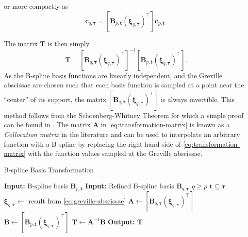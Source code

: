 or more compactly as
\begin{equation}
    [\mathbf B_{q,\boldsymbol \tau}(\boldsymbol \xi_{q,\boldsymbol \tau})^\top] \mathbf c_{q, \boldsymbol \tau} = [\mathbf B_{p,\mathbf t}(\boldsymbol \xi_{q,\boldsymbol \tau})^\top] \mathbf c_{p, \mathbf t}.
\end{equation}

The matrix $\mathbf T$ is then simply
\begin{equation}\label{eq:transformation-matrix-solution}
    \mathbf T = [\mathbf B_{q,\boldsymbol \tau}(\boldsymbol \xi_{q,\boldsymbol \tau})^\top]^{-1} [\mathbf B_{p,\mathbf t}(\boldsymbol \xi_{q,\boldsymbol \tau})^{\top}].
\end{equation}
As the B-spline basis functions are linearly independent, and the Greville abscissae are chosen such that each basis function is sampled at a point near the ``center'' of its support, the matrix $[\mathbf B_{q,\boldsymbol \tau}(\boldsymbol \xi_{q,\boldsymbol \tau})^\top]$ is always invertible. This method follows from the Schoenberg-Whitney Theorem \citep{schoenberg1988polya} for which a simple proof can be found in \cite{schoenberg2022proof}. The matrix $\mathbf A$ in \cref{eq:transformation-matrix} is known as a \emph{Collocation matrix} in the literature  and can be used to interpolate an arbitrary function with a B-spline by replacing the right hand side of \cref{eq:transformation-matrix} with the function values sampled at the Greville abscissae.

\begin{algorithm}
    \caption{B-spline Basis Transformation}\label{alg:basis-transformation}
    \begin{algorithmic}[1]
        \State \textbf{Input:} B-spline basis $\mathbf{B}_{p,\mathbf{t}}$
        \State \textbf{Input:} Refined B-spline basis $\mathbf B_{q,\boldsymbol \tau}$
        \Ensure $q \geq p$
        \Ensure $\mathbf t \subseteq \boldsymbol \tau$
        \State $\boldsymbol \xi_{q, \boldsymbol \tau} \gets$ result from \cref{eq:greville-abscissae}
        \State $\mathbf A \gets [\mathbf B_{q,\boldsymbol \tau}(\boldsymbol \xi_{q,\boldsymbol \tau})^\top]$
        \State $\mathbf B \gets [\mathbf B_{p,\mathbf t}(\boldsymbol \xi_{q,\boldsymbol \tau})^\top]$
        \State $\mathbf T \gets \mathbf A^{-1} \mathbf B$
        \State \textbf{Output:} $\mathbf T$
    \end{algorithmic}
\end{algorithm}

